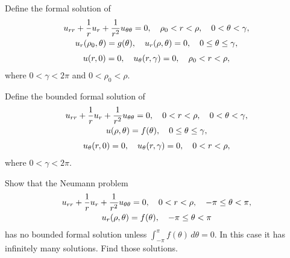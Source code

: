 \begin{exerciselist}
  \item\label{exer:12.4.5} Define the formal solution of
  \[
    \begin{array}{c}
      \displaystyle u_{rr}+\frac{1}{r}u_{r}+\frac{1}{r^{2}}u_{\theta\theta}=0,\quad \rho_{0}<r<\rho,\quad0<\theta<\gamma, \\[2\jot]
      u_{r}(\rho_{0},\theta)=g(\theta),\quad u_{r}(\rho,\theta)=0,\quad 0\le\theta\le\gamma,                     \\[2\jot]
      u(r,0)=0,\quad u_{\theta}(r,\gamma)=0,\quad\rho_{0}<r<\rho,
    \end{array}
  \]
  where $0<\gamma<2\pi$ and $0<\rho_{0}<\rho$.

  \item\label{exer:12.4.6} Define the bounded formal solution of
  \[
    \begin{array}{c}
      \displaystyle u_{rr}+\frac{1}{r}u_{r}+\frac{1}{r^{2}}u_{\theta\theta}=0,\quad 0<r<\rho,\quad0<\theta<\gamma, \\[2\jot]
      u(\rho,\theta)=f(\theta),\quad 0\le\theta\le\gamma,                                                 \\[2\jot]
      u_{\theta}(r,0)=0,\quad u_{\theta}(r,\gamma)=0,\quad0<r<\rho,
    \end{array}
  \]
  where $0<\gamma<2\pi$.

  \item\label{exer:12.4.7} Show that the Neumann problem
  \[
    \begin{array}{c}
      \displaystyle u_{rr}+\frac{1}{r}u_{r}+\frac{1}{r^{2}}u_{\theta\theta}=0,\quad 0<r<\rho,\quad-\pi\le\theta<\pi, \\[2\jot]
      u_{r}(\rho,\theta)=f(\theta),\quad-\pi\le\theta<\pi
    \end{array}
  \]
  has no bounded formal solution unless $\int_{-\pi}^{\pi}f(\theta)\,d\theta=0$. In this case it has
  infinitely many solutions. Find those solutions.
\end{exerciselist}
